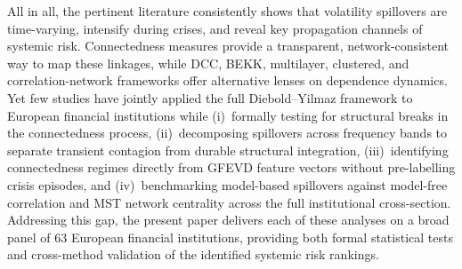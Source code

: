 All in all, the pertinent literature consistently shows that volatility spillovers are time-varying, intensify
during crises, and reveal key propagation channels of systemic risk. Connectedness
measures provide a transparent, network-consistent way to map these linkages, while DCC,
BEKK, multilayer, clustered, and correlation-network frameworks offer alternative lenses
on dependence dynamics. Yet few studies have jointly applied the full Diebold--Yilmaz framework to European
financial institutions while (i)~formally testing for structural breaks in the
connectedness process, (ii)~decomposing spillovers across frequency bands to separate
transient contagion from durable structural integration, (iii)~identifying connectedness
regimes directly from GFEVD feature vectors without pre-labelling crisis episodes, and
(iv)~benchmarking model-based spillovers against model-free correlation and MST network
centrality across the full institutional cross-section. Addressing this gap, the present
paper delivers each of these analyses on a broad panel of 63 European financial
institutions, providing both formal statistical tests and cross-method validation of the
identified systemic risk rankings.





